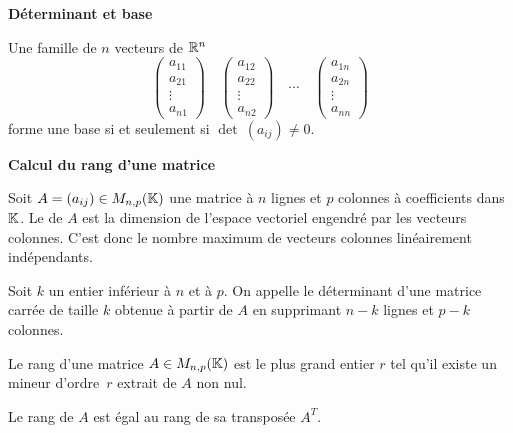\documentclass[10pt,class=article,crop=false]{standalone}
\begin{document}
\begin{multicols}{2}
\textbf{Déterminant et base}


\begin{theoreme}
	Une famille de $n$ vecteurs de $\mathbb{R}^n$
	$$\begin{pmatrix}a_{11}\\a_{21}\\\vdots\\a_{n1}\end{pmatrix}
	\quad
	\begin{pmatrix}a_{12}\\a_{22}\\\vdots\\a_{n2}\end{pmatrix}
	\quad \cdots
	\quad
	\begin{pmatrix}a_{1n}\\a_{2n}\\\vdots\\a_{nn}\end{pmatrix}$$
	forme une base si et seulement si
	$\det \ (a_{ij}) \neq 0$.
\end{theoreme}


\textbf{Calcul du rang d'une matrice}

Soit $A=(a_{ij}) \in M_{n,p}(\mathbb{K})$ une matrice à $n$ lignes
et $p$ colonnes à coefficients dans $\mathbb{K}$.
Le  de $A$ est la dimension de l'espace vectoriel engendré par les vecteurs colonnes. C'est donc le nombre maximum de vecteurs colonnes linéairement indépendants.

Soit $k$ un entier inférieur à $n$ et à $p$.
On appelle 
le déterminant d'une matrice carrée de taille $k$ obtenue à partir
de $A$ en supprimant $n-k$ lignes et $p-k$ colonnes.


\begin{theoreme}
	\label{th:mineur}
	Le rang d'une matrice $A \in M_{n,p}(\mathbb{K})$ est le plus grand entier $r$
	tel qu'il existe un mineur d'ordre~$r$ extrait de $A$ non nul.
\end{theoreme}

\begin{proposition}
	Le rang de $A$ est égal au rang de sa transposée $A^T$.
\end{proposition}



\end{multicols}
\end{document}
